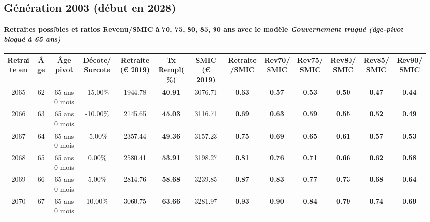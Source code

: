 \newpage 
 
\subsection{Génération 2003 (début en 2028)} 

\paragraph{Retraites possibles et ratios Revenu/SMIC à 70, 75, 80, 85, 90 ans avec le modèle \emph{Gouvernement truqué (âge-pivot bloqué à 65 ans)}}  
 
{ \scriptsize \begin{center} 
\begin{tabular}[htb]{|c|c||c|c||c|c||c||c|c|c|c|c|c|} 
\hline 
 Retraite en &  Âge &  Âge pivot &  Décote/Surcote &  Retraite (\euro{} 2019) &  Tx Rempl(\%) &  SMIC (\euro{} 2019) &  Retraite/SMIC &  Rev70/SMIC &  Rev75/SMIC &  Rev80/SMIC &  Rev85/SMIC &  Rev90/SMIC \\ 
\hline \hline 
 2065 &  62 &  65 ans 0 mois &  -15.00\% &  1944.78 &  {\bf 40.91} &  3076.71 &  {\bf {\color{red} 0.63}} &  {\bf {\color{red} 0.57}} &  {\bf {\color{red} 0.53}} &  {\bf {\color{red} 0.50}} &  {\bf {\color{red} 0.47}} &  {\bf {\color{red} 0.44}} \\ 
\hline 
 2066 &  63 &  65 ans 0 mois &  -10.00\% &  2145.65 &  {\bf 45.03} &  3116.71 &  {\bf {\color{red} 0.69}} &  {\bf {\color{red} 0.63}} &  {\bf {\color{red} 0.59}} &  {\bf {\color{red} 0.55}} &  {\bf {\color{red} 0.52}} &  {\bf {\color{red} 0.49}} \\ 
\hline 
 2067 &  64 &  65 ans 0 mois &  -5.00\% &  2357.44 &  {\bf 49.36} &  3157.23 &  {\bf {\color{red} 0.75}} &  {\bf {\color{red} 0.69}} &  {\bf {\color{red} 0.65}} &  {\bf {\color{red} 0.61}} &  {\bf {\color{red} 0.57}} &  {\bf {\color{red} 0.53}} \\ 
\hline 
 2068 &  65 &  65 ans 0 mois &  0.00\% &  2580.41 &  {\bf 53.91} &  3198.27 &  {\bf {\color{red} 0.81}} &  {\bf {\color{red} 0.76}} &  {\bf {\color{red} 0.71}} &  {\bf {\color{red} 0.66}} &  {\bf {\color{red} 0.62}} &  {\bf {\color{red} 0.58}} \\ 
\hline 
 2069 &  66 &  65 ans 0 mois &  5.00\% &  2814.76 &  {\bf 58.68} &  3239.85 &  {\bf {\color{red} 0.87}} &  {\bf {\color{red} 0.83}} &  {\bf {\color{red} 0.77}} &  {\bf {\color{red} 0.73}} &  {\bf {\color{red} 0.68}} &  {\bf {\color{red} 0.64}} \\ 
\hline 
 2070 &  67 &  65 ans 0 mois &  10.00\% &  3060.75 &  {\bf 63.66} &  3281.97 &  {\bf {\color{red} 0.93}} &  {\bf {\color{red} 0.90}} &  {\bf {\color{red} 0.84}} &  {\bf {\color{red} 0.79}} &  {\bf {\color{red} 0.74}} &  {\bf {\color{red} 0.69}} \\ 
\hline 
\hline 
\end{tabular} 
\end{center} } 
